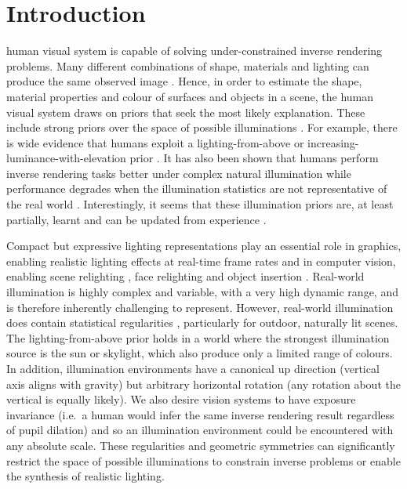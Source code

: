 \section{Introduction}

 human visual system is capable of solving under-constrained inverse rendering problems. Many different combinations of shape, materials and lighting can produce the same observed image \cite{belhumeur_bas-relief_1999}. Hence, in order to estimate the shape, material properties and colour of surfaces and objects in a scene, the human visual system draws on priors that seek the most likely explanation. These include strong priors over the space of possible illuminations \cite{murray2019visual}. For example, there is wide evidence that humans exploit a lighting-from-above or increasing-luminance-with-elevation prior \cite{hill_independent_1993, thomas_interactions_2010}. It has also been shown that humans perform inverse rendering tasks better under complex natural illumination while performance degrades when the illumination statistics are not representative of the real world \cite{fleming2003real}. Interestingly, it seems that these illumination priors are, at least partially, learnt \cite{granrud1985infants,thomas2010interactions} and can be updated from experience \cite{adams2004experience}.

Compact but expressive lighting representations play an essential role in graphics, enabling realistic lighting effects at real-time frame rates \cite{ramamoorthi_efficient_2001, tsai_all-frequency_2006, wang_all-frequency_2009, ng_all-frequency_2003, green_spherical_2003} and in computer vision, enabling scene relighting \cite{yu_outdoor_2021, yu_self-supervised_2020}, face relighting \cite{wang_face_2009, shu_neural_2017, egger_occlusion-aware_2018, sengupta_sfsnet_2018} and object insertion \cite{wang_learning_2021, song_neural_2019, li_inverse_2020}. Real-world illumination is highly complex and variable, with a very high dynamic range, and is therefore inherently challenging to represent. However, real-world illumination does contain statistical regularities \cite{dror_statistical_2004}, particularly for outdoor, naturally lit scenes. The lighting-from-above prior holds in a world where the strongest illumination source is the sun or skylight, which also produce only a limited range of colours. In addition, illumination environments have a canonical up direction (vertical axis aligns with gravity) but arbitrary horizontal rotation (any rotation about the vertical is equally likely). We also desire vision systems to have exposure invariance (i.e.~a human would infer the same inverse rendering result regardless of pupil dilation) and so an illumination environment could be encountered with any absolute scale. These regularities and geometric symmetries can significantly restrict the space of possible illuminations to constrain inverse problems or enable the synthesis of realistic lighting.

